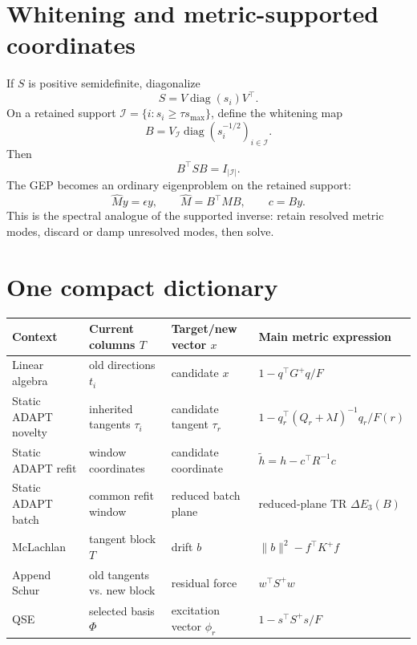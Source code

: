 \documentclass[10pt,twocolumn]{article}
\newcommand{\diag}{\operatorname{diag}}
\begin{document}
\section{Whitening and metric-supported coordinates}

If $S$ is positive semidefinite, diagonalize
\begin{equation}
S=V\diag(s_i)V^\top.
\label{eq:S_eigen}
\end{equation}
On a retained support $\mathcal I=\{i:s_i\ge\tau s_{\max}\}$, define the whitening map
\begin{equation}
B=V_{\mathcal I}\diag(s_i^{-1/2})_{i\in\mathcal I}.
\label{eq:whitening_B}
\end{equation}
Then
\begin{equation}
B^\top S B=I_{|\mathcal I|}.
\label{eq:whitened_metric}
\end{equation}
The GEP becomes an ordinary eigenproblem on the retained support:
\begin{equation}
\widehat M y=\epsilon y,
\qquad
\widehat M=B^\top M B,
\qquad
c=By.
\label{eq:whitened_gep}
\end{equation}
This is the spectral analogue of the supported inverse: retain resolved metric modes, discard or damp unresolved modes, then solve.

\section{One compact dictionary}

\begin{center}
\scriptsize
\setlength{\tabcolsep}{2pt}
\begin{tabular}{p{}p{}p{}p{}}
\toprule
Context & Current columns $T$ & Target/new vector $x$ & Main metric expression\\
\midrule
Linear algebra & old directions $t_i$ & candidate $x$ & $1-q^\top G^+q/F$\\
Static ADAPT novelty & inherited tangents $\tau_i$ & candidate tangent $\tau_r$ & $1-q_r^\top(Q_r+\lambda I)^{-1}q_r/F(r)$\\
Static ADAPT refit & window coordinates & candidate coordinate & $\widetilde h=h-c^\top R^{-1}c$\\
Static ADAPT batch & common refit window & reduced batch plane & reduced-plane TR $\Delta E_3(B)$\\
McLachlan & tangent block $T$ & drift $b$ & $\|b\|^2-f^\top K^+f$\\
Append Schur & old tangents vs. new block & residual force & $w^\top S^+w$\\
QSE & selected basis $\Phi$ & excitation vector $\phi_r$ & $1-s^\top S^+s/F$\\
\bottomrule
\end{tabular}
\end{center}
\end{document}
